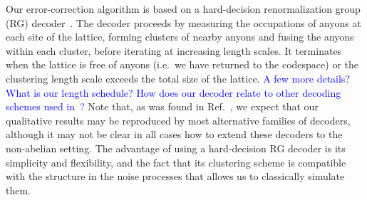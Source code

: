 \documentclass[aps, prl, letterpaper, twocolumn, superscriptaddress, notitlepage, 10pt]{revtex4-1}
\newcommand{\cggb}[1]{\textcolor{blue}{#1}}
\begin{document}
Our error-correction algorithm is based on a hard-decision renormalization group (RG) 
decoder~\cite{Bravyi2011}. 
The decoder proceeds by measuring the occupations of 
anyons at each site of the lattice, forming clusters of nearby anyons and fusing the anyons 
within each cluster, before iterating at increasing length scales.
It terminates when the lattice 
is free of anyons (i.e.~we have returned to the codespace) or the clustering length scale 
exceeds the total size of the lattice.
\cggb{A few more details? What is our length schedule?} 
\cggb{How does our decoder relate to other decoding schemes used in~\cite{Wootton2013,Brell2013,Hutter2014}?} 
Note that, as was found in Ref.~\cite{Brell2013}, we expect that our qualitative results may be reproduced by most alternative families of decoders, although it may not be clear in all cases how to extend these decoders to the non-abelian setting.
The advantage of using a hard-decision RG decoder is 
its simplicity and flexibility, and the fact that its clustering scheme is compatible with the structure in the noise processes that allows us to classically simulate them.
\end{document}
